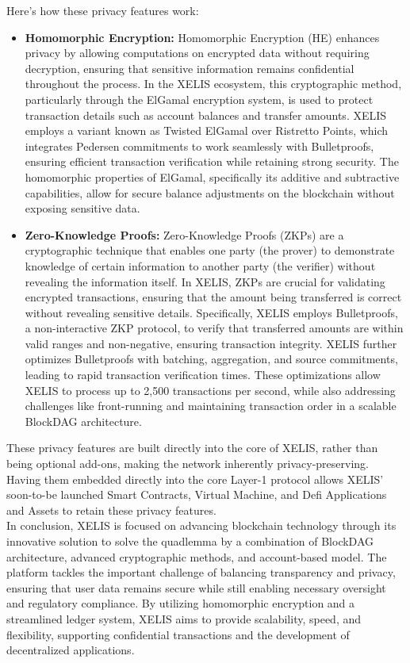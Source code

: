 \documentclass[10pt,a4paper,twocolumn]{article}
\begin{document}
Here's how these privacy features work:
\begin{itemize}
    \item \textbf{Homomorphic Encryption:} Homomorphic Encryption (HE) enhances privacy by allowing computations on encrypted data without requiring decryption, ensuring that sensitive information remains confidential throughout the process. In the XELIS ecosystem, this cryptographic method, particularly through the ElGamal encryption system, is used to protect transaction details such as account balances and transfer amounts. XELIS employs a variant known as Twisted ElGamal over Ristretto Points, which integrates Pedersen commitments to work seamlessly with Bulletproofs, ensuring efficient transaction verification while retaining strong security. The homomorphic properties of ElGamal, specifically its additive and subtractive capabilities, allow for secure balance adjustments on the blockchain without exposing sensitive data.

    \item \textbf{Zero-Knowledge Proofs:} Zero-Knowledge Proofs (ZKPs) are a cryptographic technique that enables one party (the prover) to demonstrate knowledge of certain information to another party (the verifier) without revealing the information itself. In XELIS, ZKPs are crucial for validating encrypted transactions, ensuring that the amount being transferred is correct without revealing sensitive details. Specifically, XELIS employs Bulletproofs, a non-interactive ZKP protocol, to verify that transferred amounts are within valid ranges and non-negative, ensuring transaction integrity. XELIS further optimizes Bulletproofs with batching, aggregation, and source commitments, leading to rapid transaction verification times. These optimizations allow XELIS to process up to 2,500 transactions per second, while also addressing challenges like front-running and maintaining transaction order in a scalable BlockDAG architecture.
\end{itemize}

These privacy features are built directly into the core of XELIS, rather than being optional add-ons, making the network inherently privacy-preserving. Having them embedded directly into the core Layer-1 protocol allows XELIS' soon-to-be launched Smart Contracts, Virtual Machine, and Defi Applications and Assets to retain these privacy features.\\

In conclusion, XELIS is focused on advancing blockchain technology through its innovative solution to solve the quadlemma by a combination of BlockDAG architecture, advanced cryptographic methods, and account-based model. The platform tackles the important challenge of balancing transparency and privacy, ensuring that user data remains secure while still enabling necessary oversight and regulatory compliance. By utilizing homomorphic encryption and a streamlined ledger system, XELIS aims to provide scalability, speed, and flexibility, supporting confidential transactions and the development of decentralized applications.\\
\end{document}
